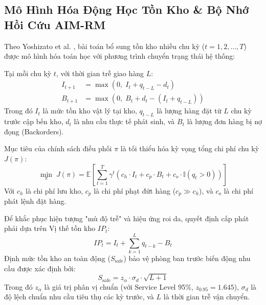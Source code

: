 \documentclass[11pt,a4paper]{article}
\begin{document}
\subsection{Mô Hình Hóa Động Học Tồn Kho \& Bộ Nhớ Hồi Cứu AIM-RM}

Theo Yoshizato et al. \cite{supplychain2026}, bài toán bổ sung tồn kho nhiều chu kỳ ($t = 1, 2, \dots, T$) được mô hình hóa toán học với phương trình chuyển trạng thái hệ thống:

\begin{formulationbox}
Tại mỗi chu kỳ $t$, với thời gian trễ giao hàng $L$:
\begin{align}
    I_{t+1} &= \max\left(0, \; I_t + q_{t-L} - d_t\right) \\
    B_{t+1} &= \max\left(0, \; B_t + d_t - (I_t + q_{t-L})\right)
\end{align}
Trong đó $I_t$ là mức tồn kho vật lý tại kho, $q_{t-L}$ là lượng hàng đặt từ $L$ chu kỳ trước cập bến kho, $d_t$ là nhu cầu thực tế phát sinh, và $B_t$ là lượng đơn hàng bị nợ đọng (Backorders).

Mục tiêu của chính sách điều phối $\pi$ là tối thiểu hóa kỳ vọng tổng chi phí chu kỳ $J(\pi)$:
\begin{equation}
    \min_{\pi} \; J(\pi) = \mathbb{E}\left[ \sum_{t=1}^{T} \gamma^t \left( c_h \cdot I_t + c_p \cdot B_t + c_o \cdot \mathbb{I}(q_t > 0) \right) \right]
\end{equation}
Với $c_h$ là chi phí lưu kho, $c_p$ là chi phí phạt đứt hàng ($c_p \gg c_h$), và $c_o$ là chi phí phát lệnh đặt hàng.
\end{formulationbox}

\begin{formulationbox}
Để khắc phục hiện tượng "mù độ trễ" và hiệu ứng roi da, quyết định cấp phát phải dựa trên Vị thế tồn kho $IP_t$:
\begin{equation}
    IP_t = I_t + \sum_{k=1}^{L} q_{t-k} - B_t
\end{equation}
Định mức tồn kho an toàn động ($S_{\text{safe}}$) bảo vệ phòng ban trước biến động nhu cầu được xác định bởi:
\begin{equation}
    S_{\text{safe}} = z_{\alpha} \cdot \sigma_d \cdot \sqrt{L + 1}
\end{equation}
Trong đó $z_{\alpha}$ là giá trị phân vị chuẩn (với Service Level 95\%, $z_{0.95} = 1.645$), $\sigma_d$ là độ lệch chuẩn nhu cầu tiêu thụ các kỳ trước, và $L$ là thời gian trễ vận chuyển.
\end{formulationbox}
\end{document}
